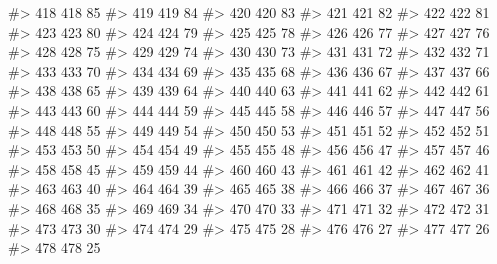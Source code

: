 \documentclass[
  letterpaper,
  DIV=11,
  numbers=noendperiod]{scrreprt}
\newenvironment{Shaded}{\begin{snugshade}}{\end{snugshade}}
\newcommand{\CommentTok}[1]{\textcolor[rgb]{0.37,0.37,0.37}{#1}}
\begin{document}
\begin{Shaded}
\begin{Highlighting}[]
\CommentTok{\#\textgreater{} 418 418   85}
\CommentTok{\#\textgreater{} 419 419   84}
\CommentTok{\#\textgreater{} 420 420   83}
\CommentTok{\#\textgreater{} 421 421   82}
\CommentTok{\#\textgreater{} 422 422   81}
\CommentTok{\#\textgreater{} 423 423   80}
\CommentTok{\#\textgreater{} 424 424   79}
\CommentTok{\#\textgreater{} 425 425   78}
\CommentTok{\#\textgreater{} 426 426   77}
\CommentTok{\#\textgreater{} 427 427   76}
\CommentTok{\#\textgreater{} 428 428   75}
\CommentTok{\#\textgreater{} 429 429   74}
\CommentTok{\#\textgreater{} 430 430   73}
\CommentTok{\#\textgreater{} 431 431   72}
\CommentTok{\#\textgreater{} 432 432   71}
\CommentTok{\#\textgreater{} 433 433   70}
\CommentTok{\#\textgreater{} 434 434   69}
\CommentTok{\#\textgreater{} 435 435   68}
\CommentTok{\#\textgreater{} 436 436   67}
\CommentTok{\#\textgreater{} 437 437   66}
\CommentTok{\#\textgreater{} 438 438   65}
\CommentTok{\#\textgreater{} 439 439   64}
\CommentTok{\#\textgreater{} 440 440   63}
\CommentTok{\#\textgreater{} 441 441   62}
\CommentTok{\#\textgreater{} 442 442   61}
\CommentTok{\#\textgreater{} 443 443   60}
\CommentTok{\#\textgreater{} 444 444   59}
\CommentTok{\#\textgreater{} 445 445   58}
\CommentTok{\#\textgreater{} 446 446   57}
\CommentTok{\#\textgreater{} 447 447   56}
\CommentTok{\#\textgreater{} 448 448   55}
\CommentTok{\#\textgreater{} 449 449   54}
\CommentTok{\#\textgreater{} 450 450   53}
\CommentTok{\#\textgreater{} 451 451   52}
\CommentTok{\#\textgreater{} 452 452   51}
\CommentTok{\#\textgreater{} 453 453   50}
\CommentTok{\#\textgreater{} 454 454   49}
\CommentTok{\#\textgreater{} 455 455   48}
\CommentTok{\#\textgreater{} 456 456   47}
\CommentTok{\#\textgreater{} 457 457   46}
\CommentTok{\#\textgreater{} 458 458   45}
\CommentTok{\#\textgreater{} 459 459   44}
\CommentTok{\#\textgreater{} 460 460   43}
\CommentTok{\#\textgreater{} 461 461   42}
\CommentTok{\#\textgreater{} 462 462   41}
\CommentTok{\#\textgreater{} 463 463   40}
\CommentTok{\#\textgreater{} 464 464   39}
\CommentTok{\#\textgreater{} 465 465   38}
\CommentTok{\#\textgreater{} 466 466   37}
\CommentTok{\#\textgreater{} 467 467   36}
\CommentTok{\#\textgreater{} 468 468   35}
\CommentTok{\#\textgreater{} 469 469   34}
\CommentTok{\#\textgreater{} 470 470   33}
\CommentTok{\#\textgreater{} 471 471   32}
\CommentTok{\#\textgreater{} 472 472   31}
\CommentTok{\#\textgreater{} 473 473   30}
\CommentTok{\#\textgreater{} 474 474   29}
\CommentTok{\#\textgreater{} 475 475   28}
\CommentTok{\#\textgreater{} 476 476   27}
\CommentTok{\#\textgreater{} 477 477   26}
\CommentTok{\#\textgreater{} 478 478   25}

\end{Highlighting}
\end{Shaded}
\end{document}
